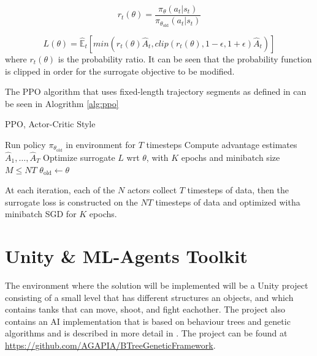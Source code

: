 \begin{equation}
    r_t(\theta) = \frac{\pi_{\theta} (a_t | s_t)}{\pi_{\theta_{\text{old}}} (a_t | s_t)}
\end{equation}

\begin{equation}
    L(\theta) = \hat{\mathbb{E}}_{t} [min(r_t(\theta) \hat{A}_{t}, clip(r_t(\theta), 1-\epsilon, 1+\epsilon) \hat{A}_{t})]
\end{equation}
where $r_t(\theta)$ is the probability ratio. It can be seen that the probability function is clipped in order for the surrogate objective to be modified.

The PPO algorithm that uses fixed-length trajectory segments as defined in \cite{schulman2017ppo} can be seen in Alogrithm \ref{alg:ppo}

\begin{algorithm}
    \caption{PPO, Actor-Critic Style}\label{alg:ppo}
    \begin{algorithmic}
            \State Run policy $\pi_{\theta_{\text{old}}}$ in environment for $T$ timesteps
            \State Compute advantage estimates $\hat{A}_{1}, \dots, \hat{A}_{T}$
        \EndFor
        \State Optimize surrogate $L$ wrt $\theta$, with $K$ epochs and minibatch size $M \leq NT$
        \State $\theta_{\text{old}} \gets \theta$
    \EndFor
    \end{algorithmic}
\end{algorithm}

At each iteration, each of the $N$ actors collect $T$ timesteps of data, then the surrogate loss is constructed on the $NT$ timesteps of data and optimized witha  minibatch SGD for $K$ epochs.


\section{Unity \& ML-Agents Toolkit}

The environment where the solution will be implemented will be a Unity project consisting of a small level that has different structures an objects, and which contains tanks that can move, shoot, and fight eachother. The project also contains an AI implementation that is based on behaviour trees and genetic algorithms and is described in more detail in \cite{paduraru2019automatic}. The project can be found at \url{https://github.com/AGAPIA/BTreeGeneticFramework}.

